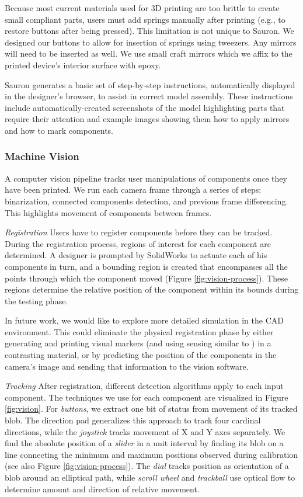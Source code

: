 Because most current materials used for 3D printing are too brittle to create small compliant parts, users must add springs manually after printing (e.g., to restore buttons after being pressed). This limitation is not unique to Sauron. We designed our buttons to allow for insertion of springs using tweezers. Any mirrors will need to be inserted as well. We use small craft mirrors which we affix to the printed device's interior surface with epoxy.

Sauron generates a basic set of step-by-step instructions, automatically displayed in the designer's browser, to assist in correct model assembly. These instructions include automatically-created screenshots of the model highlighting parts that require their attention and example images showing them how to apply mirrors and how to mark components.%

\subsubsection{Machine Vision}
A computer vision pipeline tracks user manipulations of components once they have been printed.
We run each camera frame through a series of steps: binarization, connected components detection, and previous frame differencing. This highlights movement of components between frames.

\emph{Registration}
Users have to register components before they can be tracked. During the registration process, regions of interest for each component are determined. A designer is prompted by SolidWorks to actuate each of his components in turn, and a bounding region is created that encompasses all the points through which the component moved (Figure \ref{fig:vision-process}). These regions determine the relative position of the component within its bounds during the testing phase.

In future work, we would like to explore more detailed simulation in the CAD environment. This could eliminate the physical registration phase by either generating and printing visual markers (and using sensing similar to \cite{doering-composition}) in a contrasting material, or by predicting the position of the components in the camera's image and sending that information to the vision software.

\emph{Tracking}
After registration, different detection algorithms apply to each input component. The techniques we use for each component are visualized in Figure \ref{fig:vision}. For {\em buttons}, we extract one bit of status from movement of its tracked blob. The direction pad generalizes this approach to track four cardinal directions, while the {\em joystick} tracks movement of X and Y axes separately. We find the absolute position of a {\em slider} in a unit interval by finding its blob on a line connecting the minimum and maximum positions observed during calibration (see also Figure \ref{fig:vision-process}). The {\em dial} tracks position as orientation of a blob around an elliptical path, while {\em scroll wheel} and {\em trackball} use optical flow to determine amount and direction of relative movement.

